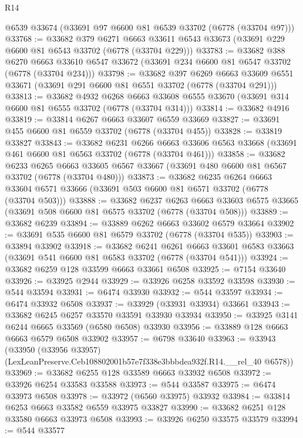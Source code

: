 \begin{lexlean}{R14}
\begin{coremodule}
    @6539
    @33674
    (@33691 @97 @6600 @81 @6539 @33702 (@6778 (@33704 @97)))
@33768 := @33682
    @379
    @6271
    @6663
    @33611
    @6543
    @33673
    (@33691 @229 @6600 @81 @6543 @33702 (@6778 (@33704 @229)))
@33783 := @33682
    @388
    @6270
    @6663
    @33610
    @6547
    @33672
    (@33691 @234 @6600 @81 @6547 @33702 (@6778 (@33704 @234)))
@33798 := @33682
    @397
    @6269
    @6663
    @33609
    @6551
    @33671
    (@33691 @291 @6600 @81 @6551 @33702 (@6778 (@33704 @291)))
@33813 := @33682
    @4932
    @6268
    @6663
    @33608
    @6555
    @33670
    (@33691 @314 @6600 @81 @6555 @33702 (@6778 (@33704 @314)))
@33814 := @33682 @4916
@33819 := @33814 @6267 @6663 @33607 @6559 @33669
@33827 := @33691 @455 @6600 @81 @6559 @33702 (@6778 (@33704 @455))
@33828 := @33819 @33827
@33843 := @33682
    @6231
    @6266
    @6663
    @33606
    @6563
    @33668
    (@33691 @461 @6600 @81 @6563 @33702 (@6778 (@33704 @461)))
@33858 := @33682
    @6233
    @6265
    @6663
    @33605
    @6567
    @33667
    (@33691 @480 @6600 @81 @6567 @33702 (@6778 (@33704 @480)))
@33873 := @33682
    @6235
    @6264
    @6663
    @33604
    @6571
    @33666
    (@33691 @503 @6600 @81 @6571 @33702 (@6778 (@33704 @503)))
@33888 := @33682
    @6237
    @6263
    @6663
    @33603
    @6575
    @33665
    (@33691 @508 @6600 @81 @6575 @33702 (@6778 (@33704 @508)))
@33889 := @33682 @6239
@33894 := @33889 @6262 @6663 @33602 @6579 @33664
@33902 := @33691 @535 @6600 @81 @6579 @33702 (@6778 (@33704 @535))
@33903 := @33894 @33902
@33918 := @33682
    @6241
    @6261
    @6663
    @33601
    @6583
    @33663
    (@33691 @541 @6600 @81 @6583 @33702 (@6778 (@33704 @541)))
@33924 := @33682 @6259 @128 @33599 @6663 @33661 @6508
@33925 := @7154 @33640
@33926 := @33925 @2944
@33929 := @33926 @6258 @33592 @33598
@33930 := @544 @33594
@33931 := @6474 @33930
@33932 := @544 @33597
@33934 := @6474 @33932 @6508
@33937 := @33929 (@33931 @33934) @33661
@33943 := @33682 @6245 @6257 @33570 @33591 @33930 @33934
@33950 := @33925 @3141 @6244 @6665 @33569 (@6580 @6508) @33930
@33956 := @33889 @128 @6663 @6663 @6579 @6508 @33902
@33957 := @6798 @33640
@33963 := @33943
    (@33950 (@33956 @33957) (LexLeanPreserve.Ceb108802001b57e7f338e3bbbdea932f.R14.__rel_40 @6578))
@33969 := @33682 @6255 @128 @33589 @6663 @33932 @6508
@33972 := @33926 @6254 @33583 @33588
@33973 := @544 @33587
@33975 := @6474 @33973 @6508
@33978 := @33972 (@6560 @33975) @33932
@33984 := @33814 @6253 @6663 @33582 @6559 @33975 @33827
@33990 := @33682 @6251 @128 @33580 @6663 @33973 @6508
@33993 := @33926 @6250 @33575 @33579
@33994 := @544 @33577

\end{coremodule}
\end{lexlean}
